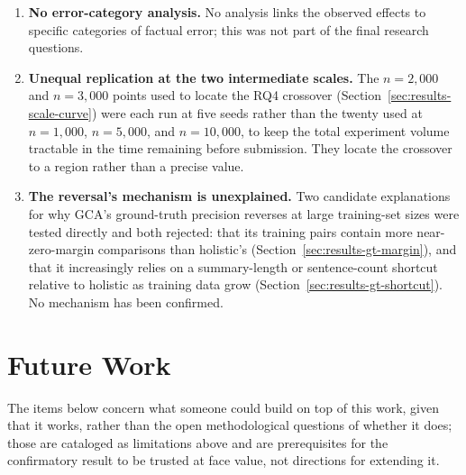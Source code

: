 \begin{enumerate}
    on three of four constructions'' should accordingly be read as three
    overlapping views of one ranking, not as three independent replications.
  \item \textbf{No error-category analysis.} No analysis links the observed
    effects to specific categories of factual error; this was not part of the
    final research questions.
  \item \textbf{Unequal replication at the two intermediate scales.} The
    $n=2{,}000$ and $n=3{,}000$ points used to locate the RQ4 crossover
    (Section~\ref{sec:results-scale-curve}) were each run at five seeds rather
    than the twenty used at $n=1{,}000$, $n=5{,}000$, and $n=10{,}000$, to keep
    the total experiment volume tractable in the time remaining before
    submission. They locate the crossover to a region rather than a precise
    value.
  \item \label{lim:reversal-mechanism-unexplained}
    \textbf{The reversal's mechanism is unexplained.} Two candidate
    explanations for why GCA's ground-truth precision reverses at large
    training-set sizes were tested directly and both rejected: that its
    training pairs contain more near-zero-margin comparisons than
    holistic's (Section~\ref{sec:results-gt-margin}), and that it increasingly
    relies on a summary-length or sentence-count shortcut relative to
    holistic as training data grow (Section~\ref{sec:results-gt-shortcut}).
    No mechanism has been confirmed.
\end{enumerate}

\section{Future Work}
\label{sec:concl-future}

The items below concern what someone could build on top of this work, given
that it works, rather than the open methodological questions of whether it
does; those are cataloged as limitations above and are prerequisites for
the confirmatory result to be trusted at face value, not directions for
extending it.

